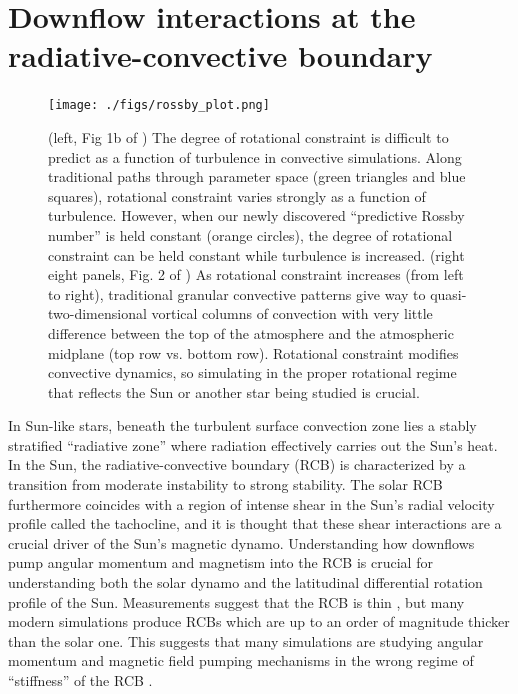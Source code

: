 \documentclass[11pt, preprint]{aastex}
\begin{document}
\section{Downflow interactions at the radiative-convective boundary}
\vspace{-0.3cm}
\label{sct:taskB}
\begin{figure}[t!]
    \texttt{[image: ./figs/rossby\_plot.png]}
    \caption{(left, Fig 1b of \citet{anders&all2019}) The degree of rotational constraint is difficult to predict as a function of turbulence in convective simulations.
	Along traditional paths through parameter space (green triangles and blue squares), rotational constraint varies strongly as a function of turbulence.
	However, when our newly discovered ``predictive Rossby number'' is held constant (orange circles), the degree of rotational constraint can be held constant while turbulence is increased.
	(right eight panels, Fig. 2 of \citet{anders&all2019}) As rotational constraint increases (from left to right), traditional granular convective patterns give way to quasi-two-dimensional vortical columns of convection with very little difference between the top of the atmosphere and the atmospheric midplane (top row vs. bottom row).
	Rotational constraint modifies convective dynamics, so simulating in the proper rotational regime that reflects the Sun or another star being studied is crucial.
	\label{fig:rossby_plot} }
\end{figure}

In Sun-like stars, beneath the turbulent surface convection zone lies a stably stratified ``radiative zone'' where radiation effectively carries out the Sun's heat.
In the Sun, the radiative-convective boundary (RCB) is characterized by a transition from moderate instability to strong stability.
The solar RCB furthermore coincides with a region of intense shear in the Sun's radial velocity profile called the tachocline, and it is thought that these shear interactions are a crucial driver of the Sun's magnetic dynamo.
Understanding how downflows pump angular momentum and magnetism into the RCB is crucial for understanding both the solar dynamo and the latitudinal differential rotation profile of the Sun.
Measurements suggest that the RCB is thin \citep{basu1997}, but many modern simulations produce RCBs which are up to an order of magnitude thicker than the solar one.
This suggests that many simulations are studying angular momentum and magnetic field pumping mechanisms in the wrong regime of ``stiffness'' of the RCB \citep{couston&all2017}.
\end{document}

